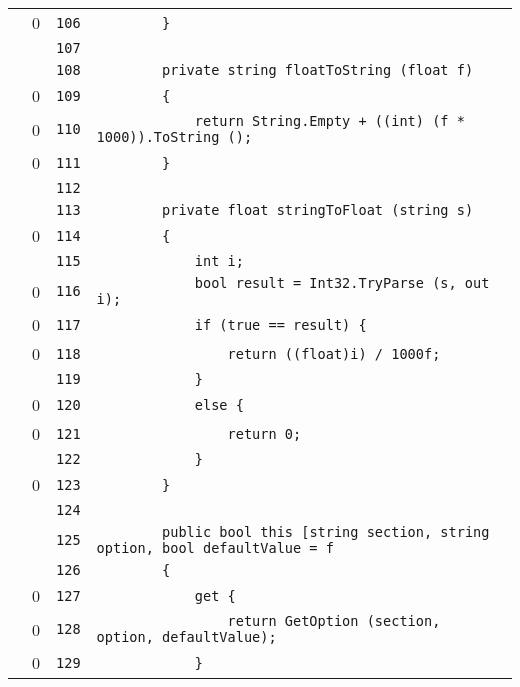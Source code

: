 \documentclass[a4paper,10pt]{article}
\begin{document}
\begin{longtable}[l]{lrrl}
\cellcolor{red} & 0 & \verb~106~ & \verb~        }~\\
\cellcolor{gray} &  & \verb~107~ & \verb~~\\
\cellcolor{gray} &  & \verb~108~ & \verb~        private string floatToString (float f)~\\
\cellcolor{red} & 0 & \verb~109~ & \verb~        {~\\
\cellcolor{red} & 0 & \verb~110~ & \verb~            return String.Empty + ((int) (f * 1000)).ToString ();~\\
\cellcolor{red} & 0 & \verb~111~ & \verb~        }~\\
\cellcolor{gray} &  & \verb~112~ & \verb~~\\
\cellcolor{gray} &  & \verb~113~ & \verb~        private float stringToFloat (string s)~\\
\cellcolor{red} & 0 & \verb~114~ & \verb~        {~\\
\cellcolor{gray} &  & \verb~115~ & \verb~            int i;~\\
\cellcolor{red} & 0 & \verb~116~ & \verb~            bool result = Int32.TryParse (s, out i);~\\
\cellcolor{red} & 0 & \verb~117~ & \verb~            if (true == result) {~\\
\cellcolor{red} & 0 & \verb~118~ & \verb~                return ((float)i) / 1000f;~\\
\cellcolor{gray} &  & \verb~119~ & \verb~            }~\\
\cellcolor{red} & 0 & \verb~120~ & \verb~            else {~\\
\cellcolor{red} & 0 & \verb~121~ & \verb~                return 0;~\\
\cellcolor{gray} &  & \verb~122~ & \verb~            }~\\
\cellcolor{red} & 0 & \verb~123~ & \verb~        }~\\
\cellcolor{gray} &  & \verb~124~ & \verb~~\\
\cellcolor{gray} &  & \verb~125~ & \verb~        public bool this [string section, string option, bool defaultValue = f~\\
\cellcolor{gray} &  & \verb~126~ & \verb~        {~\\
\cellcolor{red} & 0 & \verb~127~ & \verb~            get {~\\
\cellcolor{red} & 0 & \verb~128~ & \verb~                return GetOption (section, option, defaultValue);~\\
\cellcolor{red} & 0 & \verb~129~ & \verb~            }~\\

\end{longtable}
\end{document}
